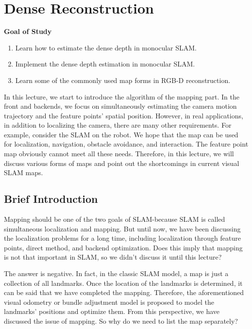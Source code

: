 \chapter{Dense Reconstruction}
\label{cpt:12}
\begin{mdframed}  
	\textbf{Goal of Study}
	\begin{enumerate}[labelindent=0em,leftmargin=1.5em]
		\item Learn how to estimate the dense depth in monocular SLAM. 
		\item Implement the dense depth estimation in monocular SLAM.
		\item Learn some of the commonly used map forms in RGB-D reconstruction. 
	\end{enumerate}
\end{mdframed}

In this lecture, we start to introduce the algorithm of the mapping part. In the front and backends, we focus on simultaneously estimating the camera motion trajectory and the feature points' spatial position. However, in real applications, in addition to localizing the camera, there are many other requirements. For example, consider the SLAM on the robot. We hope that the map can be used for localization, navigation, obstacle avoidance, and interaction. The feature point map obviously cannot meet all these needs. Therefore, in this lecture, we will discuss various forms of maps and point out the shortcomings in current visual SLAM maps.

\newpage
\section{Brief Introduction}
Mapping should be one of the two goals of SLAM-because SLAM is called simultaneous localization and mapping. But until now, we have been discussing the localization problems for a long time, including localization through feature points, direct method, and backend optimization. Does this imply that mapping is not that important in SLAM, so we didn't discuss it until this lecture?

The answer is negative. In fact, in the classic SLAM model, a map is just a collection of all landmarks. Once the location of the landmarks is determined, it can be said that we have completed the mapping. Therefore, the aforementioned visual odometry or bundle adjustment model is proposed to model the landmarks' positions and optimize them. From this perspective, we have discussed the issue of mapping. So why do we need to list the map separately?

